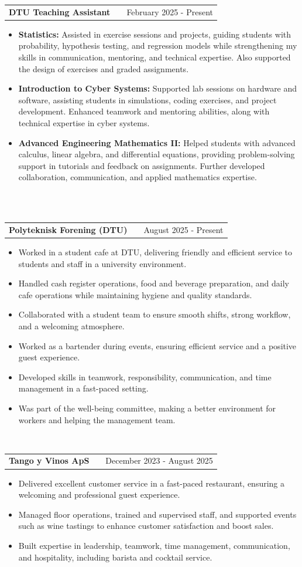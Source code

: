 \documentclass[a4paper,12pt]{article}
\makeatletter
\newenvironment{joblong}[2]
    {
    \begin{tabularx}{\linewidth}{@{}l X r@{}}
    \textbf{#1} & \hfill &  #2 \\[3.75pt]
    \end{tabularx}
    \begin{minipage}[t]{\linewidth}
    \begin{itemize}[nosep,after=\strut, leftmargin=1em, itemsep=3pt,label=--]
    }
    {
    \end{itemize}
    \end{minipage}    
    }
\makeatother
\begin{document}
\begin{joblong}{DTU Teaching Assistant}{February 2025 - Present}
\item \textbf{Statistics:} Assisted in exercise sessions and projects, guiding students with probability, hypothesis testing, and regression models while strengthening my skills in communication, mentoring, and technical expertise. Also supported the design of exercises and graded assignments.
\item \textbf{Introduction to Cyber Systems:} Supported lab sessions on hardware and software, assisting students in simulations, coding exercises, and project development. Enhanced teamwork and mentoring abilities, along with technical expertise in cyber systems.
\item \textbf{Advanced Engineering Mathematics II:} Helped students with advanced calculus, linear algebra, and differential equations, providing problem-solving support in tutorials and feedback on assignments. Further developed collaboration, communication, and applied mathematics expertise.
\end{joblong}\\\\
\begin{joblong}{Polyteknisk Forening (DTU)}{August 2025 - Present}
\item Worked in a student cafe at DTU, delivering friendly and efficient service to students and staff in a university environment.
\item Handled cash register operations, food and beverage preparation, and daily cafe operations while maintaining hygiene and quality standards.
\item Collaborated with a student team to ensure smooth shifts, strong workflow, and a welcoming atmosphere.
\item Worked as a bartender during events, ensuring efficient service and a positive guest experience.
\item Developed skills in teamwork, responsibility, communication, and time management in a fast-paced setting.
\item Was part of the well-being committee, making a better environment for workers and helping the management team.
\end{joblong}
\\
\begin{joblong}{Tango y Vinos ApS}{December 2023 - August 2025}
\item Delivered excellent customer service in a fast-paced restaurant, ensuring a welcoming and professional guest experience.  
\item Managed floor operations, trained and supervised staff, and supported events such as wine tastings to enhance customer satisfaction and boost sales.  
\item Built expertise in leadership, teamwork, time management, communication, and hospitality, including barista and cocktail service.  
\end{joblong}\\\\
\end{document}
